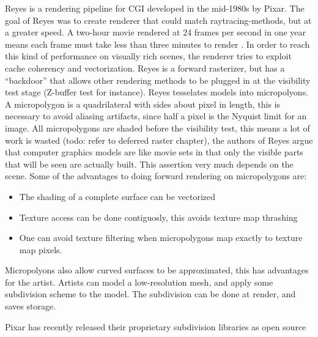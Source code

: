 	Reyes is a rendering pipeline for CGI developed in the mid-1980s by Pixar. The goal of Reyes was to create renderer that could match raytracing-methods, but at a greater speed. A two-hour movie rendered at 24 frames per second in one year means each frame must take less than three minutes to render \cite{reyes1987}. In order to reach this kind of performance on visually rich scenes, the renderer tries to exploit cache coherency and vectorization. Reyes is a forward rasterizer, but has a ``backdoor'' that allows other rendering methods to be plugged in at the visibility test stage (Z-buffer test for instance). Reyes tesselates models into micropolyons. A micropolygon is a quadrilateral with sides about \onehalf pixel in length, this is necessary to avoid aliasing artifacts, since half a pixel is the Nyquist limit for an image. All micropolygons are shaded before the visibility test, this means a lot of work is wasted (todo: refer to deferred raster chapter), the authors of Reyes argue that computer graphics models are like movie sets in that only the visible parts that will be seen are actually built. This assertion very much depends on the scene. Some of the advantages to doing forward rendering on micropolygons are:
	
\begin{itemize}
	\item The shading of a complete surface can be vectorized
	\item Texture access can be done contiguosly, this avoids texture map thrashing
	\item One can avoid texture filtering when micropolygons map exactly to texture map pixels.
\end{itemize}
	
	Micropolyons also allow curved surfaces to be approximated, this has advantages for the artist. Artists can model a low-resolution mesh, and apply some subdivision scheme to the model. The subdivision can be done at render, and saves storage.
	
	Pixar has recently released their proprietary subdivision libraries as open source \cite{pixar_subdiv}
	
	
